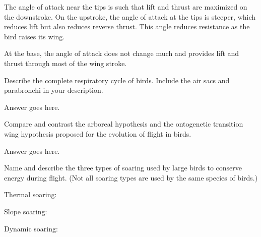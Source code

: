 \documentclass[12pt, addpoints]{exam}
\newcommand*\AnswerBox[2]{%
    \parbox[t][#1]{0.92\textwidth}{%
    \begin{solution}#2\end{solution}}
    \vspace{\stretch{1}}
}
\newenvironment{AnswerPage}[1]
    {\begin{minipage}[t][#1]{0.92\textwidth}%
    \begin{solution}}
    {\end{solution}\end{minipage}
    \vspace{\stretch{1}}}
\begin{document}
\begin{questions}
\begin{AnswerPage}{0.3\textheight}
	The angle of attack near the tips is such that lift and thrust are maximized on the downstroke. On the upstroke, the angle of attack at the tips is steeper, which reduces lift but also reduces reverse thrust. This angle reduces resistance as the bird raises its wing. 
	
	\bigskip
	
	At the base, the angle of attack does not change much and provides lift and thrust through most of the wing stroke.
		
	\end{AnswerPage}


\question[10]
Describe the complete respiratory cycle of birds. Include the air sacs and parabronchi in your description.

	\AnswerBox{0.3\textheight}{%
	Answer goes here.}

\newpage


\question[10]
Compare and contrast the arboreal hypothesis and the ontogenetic transition wing hypothesis proposed for the evolution of flight in birds.

	\AnswerBox{0.4\textheight}{Answer goes here.}%


%


\question[10]
Name and describe the three types of soaring used by large birds to conserve energy during flight. (Not all soaring types are used by the same species of birds.)

\begin{AnswerPage}{0.3\textheight}
	Thermal soaring:
	
	Slope soaring:
	
	Dynamic soaring:
\end{AnswerPage}


\end{questions}
\end{document}
